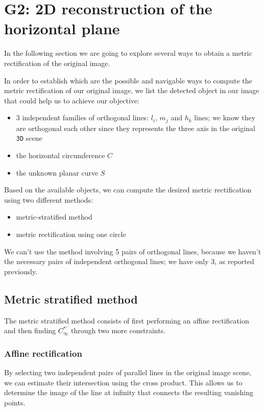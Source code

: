 \section{G2: 2D reconstruction of the horizontal plane}
In the following section we are going to explore several ways to obtain a metric rectification of the original image.

In order to establish which are the possible and navigable ways to compute the metric rectification of our original image, we list the detected object in our image that could help us to achieve our objective:
\begin{itemize}
    \item 3 independent families of orthogonal lines: $l_i$, $m_j$ and $h_k$ lines; we know they are orthogonal each other since they represents the three axis in the original \verb|3D| scene
    \item the horizontal circumference $C$
    \item the unknown planar curve $S$
\end{itemize}

\bigbreak

Based on the available objects, we can compute the desired metric rectification using two different methods:
\begin{itemize}
    \item metric-stratified method
    \item metric rectification using one circle
\end{itemize}

We can't use the method involving 5 pairs of orthogonal lines, because we haven't the necessary pairs of independent orthogonal lines; we have only 3, as reported previously.

\subsection{Metric stratified method}
The metric stratified method consists of first performing an affine rectification and then finding $C_{\infty}^{*'}$ through two more constraints.
\subsubsection{Affine rectification}
By selecting two independent pairs of parallel lines in the original image scene, we can estimate their intersection using the cross product. This allows us to determine the image of the line at infinity that connects the resulting vanishing points.

